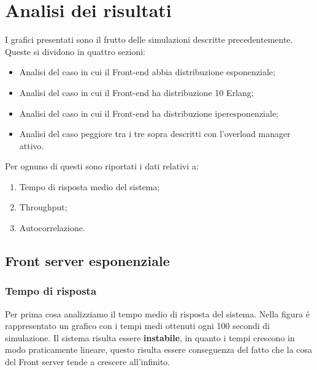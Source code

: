 \chapter{Analisi dei risultati}

I grafici presentati sono il frutto delle simulazioni descritte precedentemente. Queste si dividono in quattro sezioni:

\begin{itemize}
 \item Analisi del caso in cui il Front-end abbia distribuzione esponenziale;
 \item Analisi del caso in cui il Front-end ha distribuzione 10 Erlang;
 \item Analisi del caso in cui il Front-end ha distribuzione iperesponenziale;
 \item Analisi del caso peggiore tra i tre sopra descritti con l'overload manager attivo.
\end{itemize}

\noindent Per ognuno di questi sono riportati i dati relativi a:
\begin{enumerate}
 \item Tempo di risposta medio del sistema;
 \item Throughput;
 \item Autocorrelazione.
\end{enumerate}

\section{Front server esponenziale}

\subsection{Tempo di risposta}
Per prima cosa analizziamo il tempo medio di risposta del sistema. Nella figura \'e rappresentato un grafico con i tempi medi ottenuti ogni 100 secondi di simulazione. Il sistema risulta essere \textbf{instabile}, in quanto i tempi crescono in modo praticamente lineare, questo risulta essere conseguenza del fatto che la cosa del Front server tende a crescere all'infinito.

